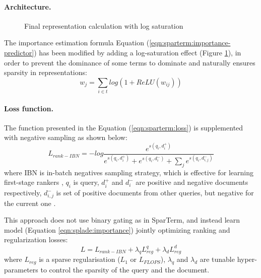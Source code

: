 \documentclass[
    twocolumn,
]{ceurart}
\begin{document}
    \paragraph{Architecture.}
    \begin{figure}[h]
        \centering
        \def\svgwidth{\columnwidth}
        
        \caption{Final representation calculation with log saturation}
        \label{fig:SPLADE}
    \end{figure}
    The importance estimation formula Equation (\ref{eqn:sparterm:importance-predictor})
    has been modified by adding a log-saturation effect (Figure \ref{fig:SPLADE}), in order to
    prevent the dominance of some terms to dominate and naturally ensures sparsity in
    representations:
    \begin{equation}
        \label{eqn:splade:importance}
        w_j=\sum_{i \in t}log(1+ReLU(w_{ij}))
    \end{equation}

    \paragraph{Loss function.}
    The function presented in the Equation (\ref{eqn:sparterm:loss}) is supplemented with negative
    sampling as shown below:
    \begin{equation}
        L_{rank-IBN}=-log
        \frac{
            e^{s(q_i,d_i^+)}
        }{
            e^{s(q_i,d_i^+)} +
            e^{s(q_i,d_i^-)} +
            \sum_j e^{s(q_i,d_{i,j}^-)}
        }
    \end{equation}
    where IBN is in-batch negatives sampling strategy, which is effective for learning first-stage
    rankers \cite{IBN1,IBN2,IBN3}, $q_i$ is query, $d_i^+$ and $d_i^-$ are positive and negative
    documents respectively, ${d_{i,j}^-}$ is set of positive documents from other queries,
    but negative for the current one \cite{SPLADE}.

    This approach does not use binary gating as in SparTerm, and instead learn model (Equation
    \ref{eqn:splade:importance}) jointly optimizing ranking and regularization losses:
    \begin{equation}
        L = L_{rank-IBN} + \lambda_q L^q_{reg} + \lambda_d L^d_{reg}
    \end{equation}
    where $L_{reg}$ is a sparse regularisation ($L_1$ or $L_{FLOPS}$), $\lambda_q$ and
    $\lambda_d$ are tunable hyper-parameters to control the sparsity of the query and the
    document. \newline
\end{document}
